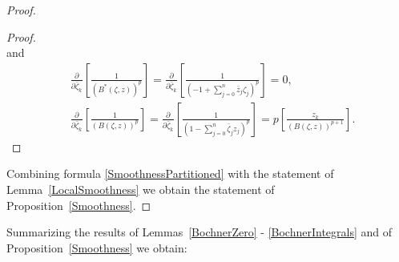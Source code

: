 \documentclass[11pt,reqno]{amsart}
\numberwithin{equation}{section}
\begin{document}
\begin{proof}
\begin{proof}
\begin{equation*}
\end{equation*}
and
\begin{equation*}
\begin{aligned}
&\frac{\partial}{\partial{\bar\zeta}_k}
\left[\frac{1}{\left(B^*(\zeta,z)\right)^{p}}\right]
=\frac{\partial}{\partial{\bar\zeta}_k}
\left[\frac{1}{\left(-1+\sum_{j=0}^n{\bar z}_j\zeta_j\right)^{p}}\right]=0,\\
&\frac{\partial}{\partial{\bar\zeta}_k}
\left[\frac{1}{\left(B(\zeta,z)\right)^{p}}\right]
=\frac{\partial}{\partial{\bar\zeta}_k}
\left[\frac{1}{\left(1-\sum_{j=0}^n{\bar\zeta}_jz_j\right)^{p}}\right]
=p\left[\frac{z_k}{\left(B(\zeta,z)\right)^{p+1}}\right].
\end{aligned}
\end{equation*}
\end{proof}
\indent
Combining formula \eqref{SmoothnessPartitioned} with the statement of
Lemma~\ref{LocalSmoothness} we obtain the statement of
Proposition~\ref{Smoothness}.
\end{proof}

\indent
Summarizing the results of Lemmas~\ref{BochnerZero} - \ref{BochnerIntegrals}
and of Proposition~\ref{Smoothness} we obtain:
\end{document}
